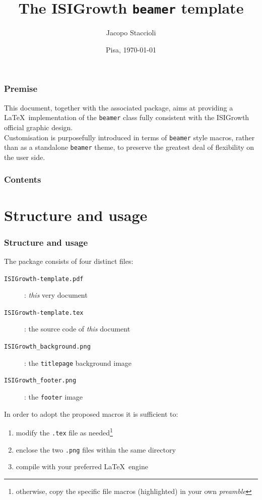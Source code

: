 \documentclass[english]{beamer}
\title[The ISIGrowth \texttt{beamer} template]{The ISIGrowth \texttt{beamer} template}
\author[Jacopo Staccioli]{Jacopo Staccioli}
\institute{\href{mailto:j.staccioli@santannapisa.it}{\texttt{j.staccioli<at>santannapisa.it}}}
\date[\today]{Pisa, \today}
\begin{document}
\begin{frame}
\vspace{5ex} %
\titlepage
\end{frame}

\begin{frame}
\frametitle{Premise}
This document, together with the associated package, aims at providing a \LaTeX\ implementation of the \texttt{beamer} class fully consistent with the ISIGrowth official graphic design.\\
\bigskip
Customisation is purposefully introduced in terms of \texttt{beamer} style macros, rather than as a standalone \texttt{beamer} theme, to preserve the greatest deal of flexibility on the user side.
\end{frame}

\begin{frame}
\frametitle{Contents}
\tableofcontents
\end{frame}

\section{Structure and usage}

\begin{frame}
\frametitle{Structure and usage}
The package consists of four distinct files:
\begin{description}
\item[\texttt{ISIGrowth-template.pdf}]: \emph{this} very document
\item[\texttt{ISIGrowth-template.tex}]: the source code of \emph{this} document
\item[\texttt{ISIGrowth\_background.png}]: the \texttt{titlepage} background image
\item[\texttt{ISIGrowth\_footer.png}]: the \texttt{footer} image
\end{description}
\bigskip
In order to adopt the proposed macros it is sufficient to:
\begin{enumerate}
\item modify the \texttt{.tex} file as needed\footnote{otherwise, copy the specific file macros (highlighted) in your own \emph{preamble}}
\item enclose the two \texttt{.png} files within the same directory
\item compile with your preferred \LaTeX\ engine
\end{enumerate}
\end{frame}
\end{document}

